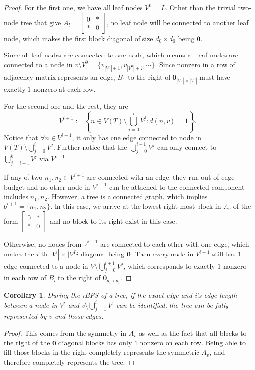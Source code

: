 \documentclass[11pt]{article}
\theoremstyle{definition}
\theoremstyle{remark}
\theoremstyle{plain}
\newtheorem{coro}[defn]{Corollary}
\begin{document}
\begin{proof}
	For the first one, we have all leaf nodes $V^0 = L$. Other than the trivial two-node tree that give $A_l= \begin{bmatrix} 0 & *\\ * &0\end{bmatrix}$, no leaf node will be connected to another leaf node, which makes the first block diagonal of size $d_0\times d_0$ being $\mathbf{0}$.

	Since all leaf nodes are connected to one node, which means all leaf nodes are connected to a node in $v\setminus V^0 = \{v_{|V^0|+1}, v_{|V^0|+2},\cdots\}$. Since nonzero in a row of adjacency matrix represents an edge, $B_1$ to the right of $\mathbf{0}_{|V^0|\times |V^0|}$ must have exactly $1$ nonzero at each row.

	For the second one and the rest, they are 
	\[
		V^{i+1} := \left\{n\in V(T)\setminus \bigcup_{j=0}^{i}V^j: d(n, v) = 1\right\}.
	\]
	Notice that $\forall n\in V^{i+1}$, it only has one edge connected to node in $V(T)\setminus \bigcup_{j=0}^{i}V^j$. Further notice that the $\bigcup_{j=0}^{i+1}V^j$ can only connect to $\bigcup_{j=i+1}^{k}V^j$ via $V^{i+1}$.
	
	If any of two $n_1,n_2\in V^{i+1}$ are connected with an edge, they run out of edge budget and no other node in $V^{i+1}$ can be attached to the connected component includes $n_1,n_2$. However, a tree is a connected graph, which implies $b^{i+1} = \{n_1,n_2\}$. In this case, we arrive at the lowest-right-most block in $A_v$ of the form $\begin{bmatrix}
		0 & *\\
		* & 0
	\end{bmatrix}$ and no block to its right exist in this case.

	Otherwise, no nodes from $V^{i+1}$ are connected to each other with one edge, which makes the $i$-th $|V^i|\times |V^Ii$ diagonal being $\mathbf{0}$. Then every node in $V^{i+1}$ still has $1$ edge connected to a node in $V\setminus \bigcup_{j=0}^{i+1}V^{j}$, which corresponds to exactly $1$ nonzero in each row of $B_i$ to the right of $\mathbf{0}_{d_i\times d_i}$.
\end{proof}

\begin{coro}
	During the rBFS of a tree, if the exact edge and its edge length between a node in $V^{i}$ and $v\setminus \bigcup_{j=1}^iV^{j}$ can be identified, the tree can be fully represented by $v$ and those edges.
\end{coro}
\begin{proof}
	This comes from the symmetry in $A_v$ as well as the fact that all blocks to the right of the $\mathbf{0}$ diagonal blocks has only $1$ nonzero on each row. Being able to fill those blocks in the right completely represents the symmetric $A_v$, and therefore completely represents the tree.
\end{proof}
\end{document}
